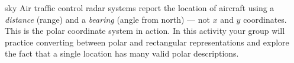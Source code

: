 \documentclass[10pt]{article}
\begin{document}
\namepartnerperiod

\vspace{0.10in}

\begin{scenariobox}{sky}
Air traffic control radar systems report the location of aircraft using a
\emph{distance} (range) and a \emph{bearing} (angle from north) --- not $x$
and $y$ coordinates. This is the polar coordinate system in action. In this
activity your group will practice converting between polar and rectangular
representations and explore the fact that a single location has many valid
polar descriptions.
\end{scenariobox}

\vspace{0.08in}
\end{document}
